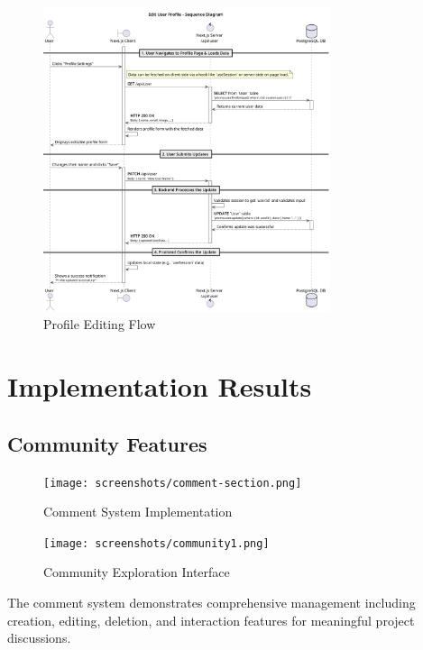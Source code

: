 \begin{figure}[H]
\centering
\includegraphics[width=0.75\textwidth]{conception/SprintV/sequence_diagrams/sequence_profileManagement_7_1_EditUserProfile.png}
\caption{Profile Editing Flow}
\label{fig:seq_edit_profile}
\end{figure}

\section{Implementation Results}

\subsection{Community Features}
\begin{figure}[H]
    \centering
    \texttt{[image: screenshots/comment-section.png]}
    \caption{Comment System Implementation}
    \label{fig:comment_section}
    \end{figure}

\begin{figure}[H]
\centering
\texttt{[image: screenshots/community1.png]}
\caption{Community Exploration Interface}
\label{fig:community_main}
\end{figure}




The comment system demonstrates comprehensive management including creation, editing, deletion, and interaction features for meaningful project discussions.



